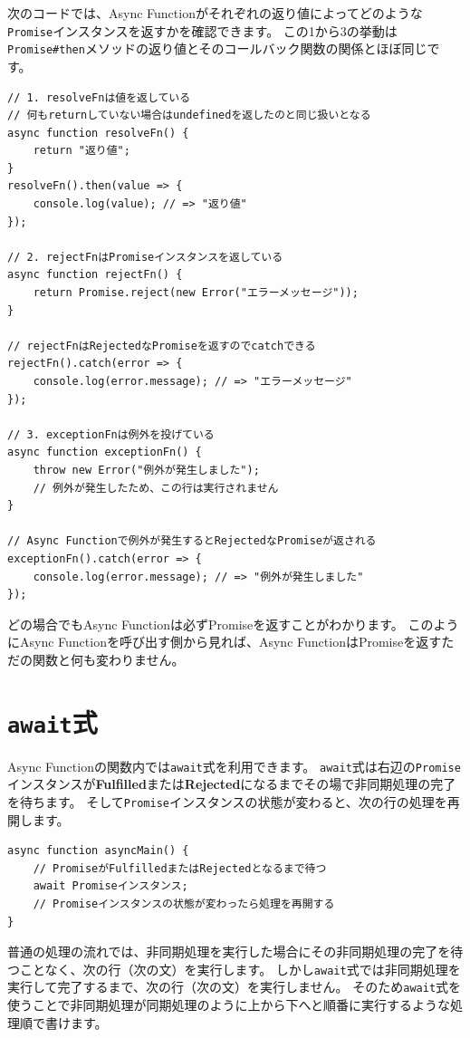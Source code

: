 次のコードでは、Async
Functionがそれぞれの返り値によってどのような\texttt{Promise}インスタンスを返すかを確認できます。
この1から3の挙動は\texttt{Promise\#then}メソッドの返り値とそのコールバック関数の関係とほぼ同じです。

\begin{lstlisting}
// 1. resolveFnは値を返している
// 何もreturnしていない場合はundefinedを返したのと同じ扱いとなる
async function resolveFn() {
    return "返り値";
}
resolveFn().then(value => {
    console.log(value); // => "返り値"
});

// 2. rejectFnはPromiseインスタンスを返している
async function rejectFn() {
    return Promise.reject(new Error("エラーメッセージ"));
}

// rejectFnはRejectedなPromiseを返すのでcatchできる
rejectFn().catch(error => {
    console.log(error.message); // => "エラーメッセージ"
});

// 3. exceptionFnは例外を投げている
async function exceptionFn() {
    throw new Error("例外が発生しました");
    // 例外が発生したため、この行は実行されません
}

// Async Functionで例外が発生するとRejectedなPromiseが返される
exceptionFn().catch(error => {
    console.log(error.message); // => "例外が発生しました"
});
\end{lstlisting}

どの場合でもAsync Functionは必ずPromiseを返すことがわかります。
このようにAsync Functionを呼び出す側から見れば、Async
FunctionはPromiseを返すただの関数と何も変わりません。

\hypertarget{await-expression}{%
\section{\texorpdfstring{\texttt{await}式}{await式}}\label{await-expression}}

Async
Functionの関数内では\texttt{await}式を利用できます。
\texttt{await}式は右辺の\texttt{Promise}インスタンスが\textbf{Fulfilled}または\textbf{Rejected}になるまでその場で非同期処理の完了を待ちます。
そして\texttt{Promise}インスタンスの状態が変わると、次の行の処理を再開します。

\begin{lstlisting}
async function asyncMain() {
    // PromiseがFulfilledまたはRejectedとなるまで待つ
    await Promiseインスタンス;
    // Promiseインスタンスの状態が変わったら処理を再開する
}
\end{lstlisting}

普通の処理の流れでは、非同期処理を実行した場合にその非同期処理の完了を待つことなく、次の行（次の文）を実行します。
しかし\texttt{await}式では非同期処理を実行して完了するまで、次の行（次の文）を実行しません。
そのため\texttt{await}式を使うことで非同期処理が同期処理のように上から下へと順番に実行するような処理順で書けます。

